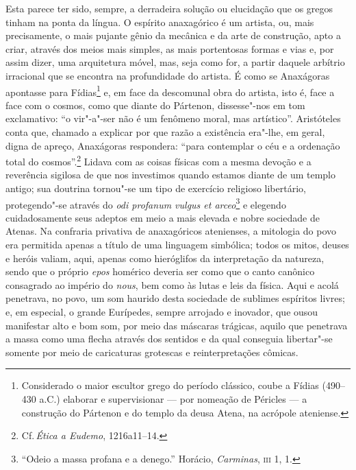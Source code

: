  Esta parece ter sido, sempre, a derradeira solução ou elucidação que os
 gregos tinham na ponta da língua. O espírito anaxagórico é um artista, ou,
 mais precisamente, o mais pujante gênio da mecânica e da arte de construção,
 apto a criar, através dos meios mais simples, as mais portentosas formas e
 vias e, por assim dizer, uma arquitetura móvel, mas, seja como for, a partir
 daquele arbítrio irracional que se encontra na profundidade do artista. É
 como se Anaxágoras apontasse para Fídias\footnote{Considerado o maior
 escultor grego do período clássico, coube a Fídias (490--430 a.C.) elaborar
 e supervisionar --- por nomeação de Péricles --- a construção do Pártenon e do
 templo da deusa Atena, na acrópole ateniense.} e, em face da descomunal obra
 do artista, isto é, face a face com o cosmos, como que diante do Pártenon,
 dissesse"-nos em tom exclamativo: ``o vir"-a"-ser não é um fenômeno moral,
 mas artístico''. Aristóteles conta que, chamado a explicar por que razão a
 existência era"-lhe, em geral, digna de apreço, Anaxágoras respondera:
 ``para contemplar o céu e a ordenação total do cosmos''.\footnote
 { Cf.\,\textit{Ética a Eudemo}, 1216a11--14.} Lidava com as coisas físicas
 com a mesma devoção e a reverência sigilosa de que nos investimos quando
 estamos diante de um templo antigo; sua doutrina tornou"-se um tipo de
 exercício religioso libertário, protegendo"-se através do \textit{odi profanum 
 vulgus et arceo}\footnote{``Odeio a massa profana e a
 denego.'' Horácio, \textit{Carminas}, \textsc{iii} 1, 1.} e elegendo 
 cuidadosamente seus adeptos em meio a mais elevada e nobre sociedade de 
 Atenas. Na confraria privativa
 de anaxagóricos atenienses, a mitologia do povo era permitida apenas a
 título de uma linguagem simbólica; todos os mitos, deuses e heróis valiam,
 aqui, apenas como hieróglifos da interpretação da natureza, sendo que o
 próprio \textit{epos} homérico deveria ser como que o canto canônico
 consagrado ao império do \textit{nous}, bem como às lutas e leis da física.
 Aqui e acolá penetrava, no povo, um som haurido desta sociedade de sublimes
 espíritos livres; e, em especial, o grande Eurípedes, sempre arrojado e
 inovador, que ousou manifestar alto e bom som, por meio das máscaras
 trágicas, aquilo que penetrava a massa como uma flecha através dos sentidos
 e da qual conseguia libertar"-se somente por meio de caricaturas grotescas e
 reinterpretações cômicas.

